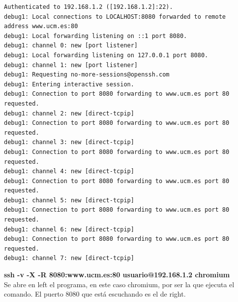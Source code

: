 \documentclass[11pt]{article}
\begin{document}
\begin{lstlisting}
Authenticated to 192.168.1.2 ([192.168.1.2]:22).
debug1: Local connections to LOCALHOST:8080 forwarded to remote address www.ucm.es:80
debug1: Local forwarding listening on ::1 port 8080.
debug1: channel 0: new [port listener]
debug1: Local forwarding listening on 127.0.0.1 port 8080.
debug1: channel 1: new [port listener]
debug1: Requesting no-more-sessions@openssh.com
debug1: Entering interactive session.
debug1: Connection to port 8080 forwarding to www.ucm.es port 80 requested.
debug1: channel 2: new [direct-tcpip]
debug1: Connection to port 8080 forwarding to www.ucm.es port 80 requested.
debug1: channel 3: new [direct-tcpip]
debug1: Connection to port 8080 forwarding to www.ucm.es port 80 requested.
debug1: channel 4: new [direct-tcpip]
debug1: Connection to port 8080 forwarding to www.ucm.es port 80 requested.
debug1: channel 5: new [direct-tcpip]
debug1: Connection to port 8080 forwarding to www.ucm.es port 80 requested.
debug1: channel 6: new [direct-tcpip]
debug1: Connection to port 8080 forwarding to www.ucm.es port 80 requested.
debug1: channel 7: new [direct-tcpip]
\end{lstlisting}

      \bigskip
      \par
      \textbf{ssh -v -X -R 8080:www.ucm.es:80 usuario@192.168.1.2 chromium}\\
      Se abre en left el programa, en este caso chromium, por ser la que ejecuta el comando. El
      puerto 8080 que está escuchando es el de right.
\end{document}
